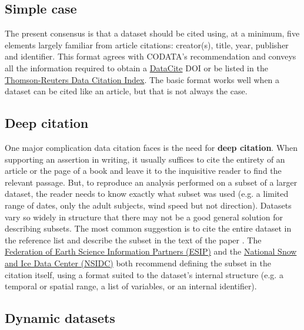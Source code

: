 \documentclass[10pt,a4paper,twocolumn]{article}
\begin{document}
{\subsection*{Simple case}\label{simple-case}

The present consensus is that a dataset should be cited using, at a minimum, five elements largely familiar from article citations: creator(s), title, year, publisher and identifier.
This format agrees with CODATA's recommendation\cite{codata-icsti_task_group_on_data_citation_standards_and_practices_out_2013} and conveys all the information required to obtain a \href{http://www.datacite.org/}{DataCite} DOI\cite{starr_iscitedby:_2011} or be listed in the \href{http://thomsonreuters.com/data-citation-index/}{Thomson-Reuters Data Citation Index}.
The basic format works well when a dataset can be cited like an article, but that is not always the case.

\subsection*{Deep citation}\label{deep-citation}

One major complication data citation faces is the need for \textbf{deep citation}.
When supporting an assertion in writing, it usually suffices to cite the entirety of an article or the page of a book and leave it to the inquisitive reader to find the relevant passage.
But, to reproduce an analysis performed on a subset of a larger dataset, the reader needs to know exactly what subset was used (e.g. a limited range of dates, only the adult subjects, wind speed but not direction).
Datasets vary so widely in structure that there may not be a good general solution for describing subsets.
The most common suggestion is to cite the entire dataset in the reference list and describe the subset in the text of the paper \cite{altman_proposed_2007}.
The \href{http://wiki.esipfed.org/index.php/Interagency_Data_Stewardship/Citations/provider_guidelines#Subset_Used}{Federation of Earth Science Information Partners (ESIP)} and the \href{http://nsidc.org/about/use_copyright.html}{National Snow and Ice Data Center (NSIDC)} both recommend defining the subset in the citation itself, using a format suited to the dataset's internal structure (e.g. a temporal or spatial range, a list of variables, or an internal identifier).

\subsection*{Dynamic datasets}\label{dynamic-data}

}
\end{document}
